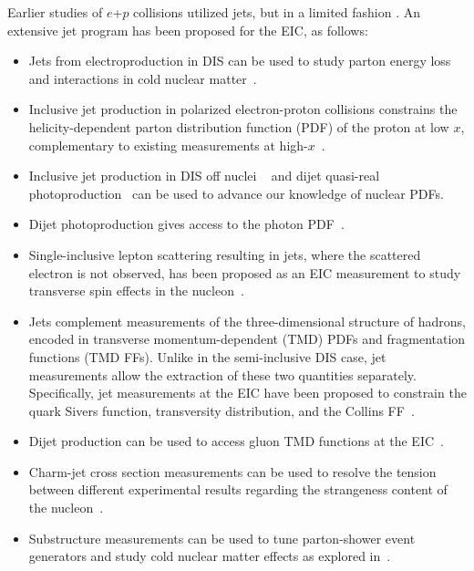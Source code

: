 Earlier studies of $e$+$p$ collisions utilized jets, but in a limited fashion \cite{Wong:2020xtc}.
An extensive jet program has been proposed for the EIC, as follows: 
%
\begin{itemize}
\item Jets from electroproduction in DIS can be used to study parton energy loss and interactions in cold nuclear matter~\cite{Arratia:2019vju}.
\item Inclusive jet production in polarized electron-proton collisions constrains the helicity-dependent parton distribution function (PDF) of the proton at low $x$, complementary to existing measurements at high-$x$~\cite{Boughezal:2018azh}. 

\item Inclusive jet production in DIS off nuclei ~\cite{Klasen:2017kwb} and dijet quasi-real photoproduction~\cite{Klasen:2018gtb} can be used to advance our knowledge of nuclear PDFs. 
\item Dijet photoproduction gives access to the photon PDF~\cite{Chu:2017mnm}. \item Single-inclusive lepton scattering resulting in jets, where the scattered electron is not observed, has been proposed as an EIC measurement to study transverse spin effects in the nucleon~\cite{Hinderer:2015hra,Hinderer:2017ntk}.

\item Jets complement measurements of the three-dimensional structure of hadrons, encoded in transverse momentum-dependent (TMD) PDFs and fragmentation functions (TMD FFs).
Unlike in the semi-inclusive DIS case, jet measurements allow the extraction of these two quantities separately. Specifically, jet measurements at the EIC have been proposed to constrain the quark Sivers function, transversity distribution, and the Collins FF~\cite{Arratia:2020nxw}. 
\item Dijet production can be used to access gluon TMD functions at the EIC~\cite{Zheng:2018ssm,Dumitru:2018kuw}.

\item Charm-jet cross section measurements can be used to resolve the tension between different experimental results regarding the strangeness content of the nucleon~\cite{Arratia:2020azl}.

\item Substructure measurements can be used to tune parton-shower event generators and study cold nuclear matter effects as explored in~\cite{Aschenauer:2019uex}.
\end{itemize}

